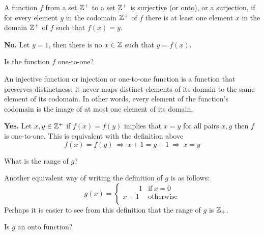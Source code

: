 \documentclass[a4paper, english, 12pt]{article} %
\begin{document}
\begin{answer}
  A function $f$ from a set $\mathbb{Z}^+$ to a set $\mathbb{Z}^+$ is surjective (or onto), or a
  surjection, if for every element $y$ in the codomain $\mathbb{Z}^+$ of $f$ there is at
  least one element $x$ in the domain $\mathbb{Z}^+$ of $f$ such that $f(x) = y$.

  \textbf{No.} Let $y = 1$, then there is no $x \in \mathbb{Z}$ such that $y = f(x)$. 
\end{answer}

\begin{answer}
\end{answer}

\begin{subproblem}
  Is the function $f$ one-to-one?
\end{subproblem} 

\begin{answer}
  An injective function or injection or one-to-one function is a function that
  preserves distinctness: it never maps distinct elements of its domain to the
  same element of its codomain. In other words, every element of the function's
  codomain is the image of at most one element of its domain.

  \textbf{Yes.} Let $x, y \in \mathbb{Z}^+$ if $f(x) = f(y)$ implies that $x = y$ for
  all pairs $x,y$ then $f$ is one-to-one. This is equivalent with the definition
  above
  \begin{equation*}
    f(x) = f(y) \ \Rightarrow \ x + 1 = y + 1 \ \Rightarrow \ x = y
  \end{equation*}
\end{answer}

\begin{subproblem}
  What is the range of $g$?
\end{subproblem}

\begin{answer}
  Another equivalent way of writing the definition of $g$ is as follows:
  \begin{equation*}
    g(x) =
    \begin{cases}
      \phantom{x - }\;\,1 & \text{if} \ x = 0 \\
      x - 1 & \text{otherwise} \\
    \end{cases}
  \end{equation*}
  Perhaps it is easier to see from this definition that the range of $g$ is $\mathbb{Z}_+$.
\end{answer}

\begin{subproblem}
  Is $g$ an onto function?
\end{subproblem} 
\end{document}
